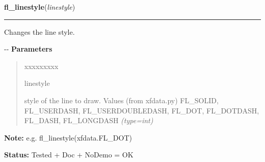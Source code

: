 \hspace{.8\funcindent}\begin{boxedminipage}{\funcwidth}

    \raggedright \textbf{fl\_linestyle}(\textit{linestyle})

    \vspace{-1.5ex}

    \rule{\textwidth}{0.5\fboxrule}
\setlength{\parskip}{2ex}

Changes the line style.

-{}-
\setlength{\parskip}{1ex}
      \textbf{Parameters}
      \vspace{-1ex}

      \begin{quote}
        \begin{Ventry}{xxxxxxxxx}

          \item[linestyle]


style of the line to draw. Values (from xfdata.py) FL\_SOLID,
FL\_USERDASH, FL\_USERDOUBLEDASH, FL\_DOT, FL\_DOTDASH, FL\_DASH,
FL\_LONGDASH
            {\it (type=int)}

        \end{Ventry}

      \end{quote}

\textbf{Note:} 
e.g. fl\_linestyle(xfdata.FL\_DOT)


\textbf{Status:} 
Tested + Doc + NoDemo = OK


    \end{boxedminipage}

    \label{xformslib:flxbasic:fl_linestyle}

    \vspace{0.5ex}

